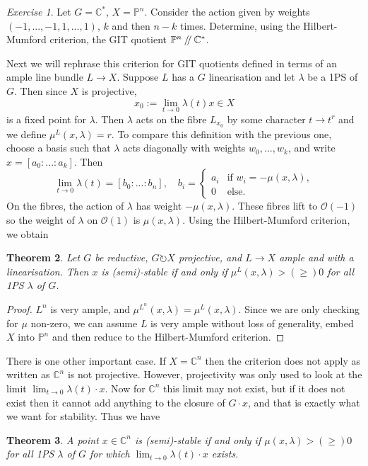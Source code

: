 \documentclass{article}
\newtheorem{theorem}{Theorem}
\theoremstyle{definition}
\theoremstyle{remark}
\newtheorem{exercise}[theorem]{Exercise}
\numberwithin{theorem}{section}
\newcommand{\C}{\mathbb{C}}
\newcommand{\bP}{\mathbb{P}}
\newcommand{\OO}{\mathcal{O}}
\newcommand{\sslash}{\mathbin{/\mkern-4mu/}}
\newenvironment{thm}{
\begin{mdframed}
	\vspace{-0.5em}
	\begin{theorem}
}{
	\end{theorem}
\end{mdframed}
}
\begin{document}
	\begin{exercise}
		Let $G=\C^\ast$, $X=\bP^n$. Consider the action given by weights $(-1,...,-1,1,...,1)$, $k$ and then $n-k$ times. Determine, using the Hilbert-Mumford criterion, the GIT quotient $\bP^n\sslash\C^\ast$.
	\end{exercise}
	Next we will rephrase this criterion for GIT quotients defined in terms of an ample line bundle $L\to X$. Suppose $L$ has a $G$ linearisation and let $\lambda$ be a 1PS of $G$. Then since $X$ is projective,
	\begin{equation}
		x_0 := \lim_{t\to 0} \lambda(t)x\in X
	\end{equation}
	is a fixed point for $\lambda$. Then $\lambda$ acts on the fibre $L_{x_0}$ by some character $t\to t^r$ and we define $\mu^L(x,\lambda)=r$. To compare this definition with the previous one, choose a basis such that $\lambda$ acts diagonally with weights $w_0,...,w_k$, and write $\hat{x}=[a_0:...:a_k]$. Then
	\begin{equation}
		\lim_{t\to 0}\lambda(t) = [b_0:...:b_n], \quad b_i = \begin{cases}
			a_i & \text{if } w_i=-\mu(x,\lambda),\\
			0 & \text{else}.
		\end{cases}
	\end{equation}
	On the fibres, the action of $\lambda$ has weight $-\mu(x,\lambda)$. These fibres lift to $\OO(-1)$ so the weight of $\lambda$ on $\OO(1)$ is $\mu(x,\lambda)$. Using the Hilbert-Mumford criterion, we obtain
	\begin{thm}
		Let $G$ be reductive, $G\circlearrowright X$ projective, and $L\to X$ ample and with a linearisation. Then $x$ is (semi)-stable if and only if $\mu^L(x,\lambda)>(\geq)0$ for all 1PS $\lambda$ of $G$.
	\end{thm}
	\begin{proof}
		$L^n$ is very ample, and $\mu^{L^n}(x,\lambda)=\mu^L(x,\lambda)$. Since we are only checking for $\mu$ non-zero, we can assume $L$ is very ample without loss of generality, embed $X$ into $\bP^n$ and then reduce to the Hilbert-Mumford criterion.
	\end{proof}
	There is one other important case. If $X=\C^n$ then the criterion does not apply as written as $\C^n$ is not projective. However, projectivity was only used to look at the limit $\lim_{t\to0}\lambda(t)\cdot x$. Now for $\C^n$ this limit may not exist, but if it does not exist then it cannot add anything to the closure of $G\cdot x$, and that is exactly what we want for stability. Thus we have
	\begin{theorem}
		A point $x\in\C^n$ is (semi)-stable if and only if $\mu(x,\lambda)>(\geq)0$ for all 1PS $\lambda$ of $G$ for which $\lim_{t\to0}\lambda(t)\cdot x$ exists.
	\end{theorem}
	
\end{document}
